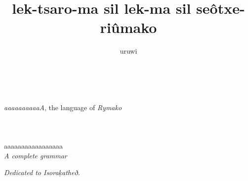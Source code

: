 \documentclass{book}
\title{lek-\bs{}tsaro-ma sil lek-ma sil se\^otxe-\bs{}ri\^umako}
\author{uruwi}
\newcommand{\lname}{aaaaaaaaaaA}
\begin{document}
\pagecolor{Thistle!25}

\begin{titlepage}
    \makeatletter
    \begin{center}
        {\color{Orchid} \hprule \vspace{1.5ex} \\}
        {\Huge \kardinal \textcolor{Plum}{\@title}\\}
        {\large \textit{\lname}, the language of \textit{Rymako} \\}
        {\color{Orchid} \hprule \vspace{1.5ex} \\}
        \vspace{1.5cm}
        {\Large\bfseries \@author}\\[5pt]
        \vspace{2cm}
         \\
        {aaaaaaaaaaaaaaaaa} \\[5pt]
        \emph{A complete grammar}\\[2cm]
        \vfill
        \vfill
        {\@date}
    \end{center}
    \makeatother
\end{titlepage}

\pagecolor{Thistle!15}

\begin{center}
    \textit{Dedicated to Isoraķatheð.}
\end{center}
\end{document}
